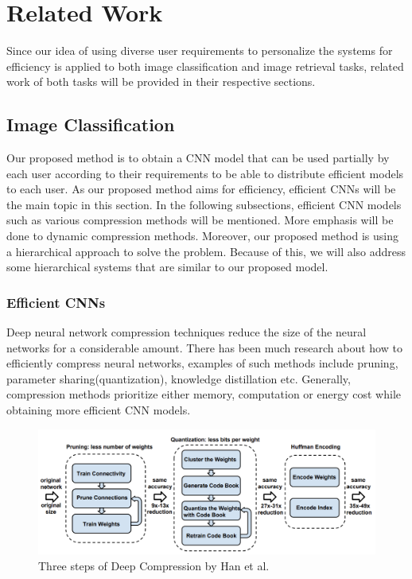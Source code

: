 
\lhead[\chaptername~\thechapter]{\rightmark}

\rhead[\leftmark]{}

\lfoot[\thepage]{}

\cfoot{}

\rfoot[]{\thepage}

\chapter{Related Work}
\label{related}


Since our idea of using diverse user requirements to personalize the systems for efficiency is applied to both image classification and image retrieval tasks, related work of both tasks will be provided in their respective sections.

\section{Image Classification}

Our proposed method is to obtain a CNN model that can be used partially by each user according to their requirements to be able to distribute efficient models to each user.
As our proposed method aims for efficiency, efficient CNNs will be the main topic in this section.
In the following subsections, efficient CNN models such as various compression methods will be mentioned.
More emphasis will be done to dynamic compression methods.
Moreover, our proposed method is using a hierarchical approach to solve the problem. 
Because of this, we will also address some hierarchical systems that are similar to our proposed model.

\subsection*{Efficient CNNs}

Deep neural network compression techniques reduce the size of the neural networks for a considerable amount. 
There has been much research about how to efficiently compress neural networks, examples of such methods include pruning, parameter sharing(quantization), knowledge distillation etc. 
Generally, compression methods prioritize either memory, computation or energy cost while obtaining more efficient CNN models.

\begin{figure}
    \centering
    \includegraphics[width=\textwidth]{thesis/images/deep_comp-fig.png}
    \caption{Three steps of Deep Compression by Han et al.\cite{han2015deep}}
    \label{fig:deepcomp}
\end{figure}

